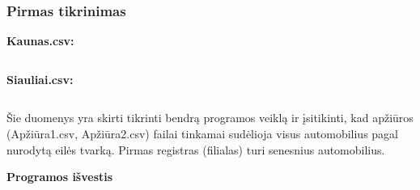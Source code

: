 \documentclass{article}
\begin{document}
\subsubsection{Pirmas tikrinimas}
\begin{changemargin}{0cm}{0cm}
    \textbf{Kaunas.csv:}
\end{changemargin}

\inputminted{csharp}{Assets/L3/test1-input1.txt}

\begin{changemargin}{0cm}{0cm}
    \textbf{Siauliai.csv:}
\end{changemargin}

\inputminted{csharp}{Assets/L3/test1-input2.txt}

Šie duomenys yra skirti tikrinti bendrą programos veiklą ir įsitikinti, kad apžiūros (Apžiūra1.csv, Apžiūra2.csv)
failai tinkamai sudėlioja visus automobilius pagal nurodytą eilės tvarką.
Pirmas registras (filialas) turi senesnius automobilius.

\textbf{Programos išvestis}
\end{document}
